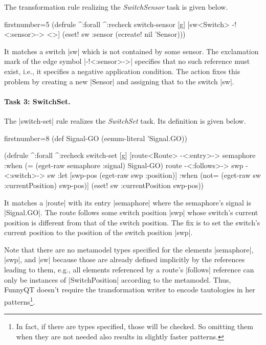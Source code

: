 \documentclass[submission]{eptcs}
\newcommand{\code}{\clojureinline}
\begin{document}
The transformation rule realizing the \emph{SwitchSensor} task is given below.

\begin{clojurecode*}{firstnumber=5}
(defrule ^:forall ^:recheck switch-sensor [g]
  [sw<Switch> -!<:sensor>-> <>]
  (eset! sw :sensor (ecreate! nil 'Sensor)))
\end{clojurecode*}

It matches a switch \code|sw| which is not contained by some sensor.  The
exclamation mark of the edge symbol \code|-!<:sensor>->| specifies that no such
reference must exist, i.e., it specifies a negative application condition.  The
action fixes this problem by creating a new \code|Sensor| and assigning that to
the switch \code|sw|.


\paragraph{Task 3: SwitchSet.}

The \code|switch-set| rule realizes the \emph{SwitchSet} task.  Its definition
is given below.

\begin{clojurecode*}{firstnumber=8}
(def Signal-GO (eenum-literal 'Signal.GO))

(defrule ^:forall ^:recheck switch-set [g]
  [route<Route> -<:entry>-> semaphore
   :when (= (eget-raw semaphore :signal) Signal-GO)
   route -<:follows>-> swp -<:switch>-> sw
   :let [swp-pos (eget-raw swp :position)]
   :when (not= (eget-raw sw :currentPosition) swp-pos)]
  (eset! sw :currentPosition swp-pos))
\end{clojurecode*}

It matches a \code|route| with its entry \code|semaphore| where the semaphore's
signal is \code|Signal.GO|.  The route follows some switch position \code|swp|
whose switch's current position is different from that of the switch position.
The fix is to set the switch's current position to the position of the switch
position \code|swp|.

Note that there are no metamodel types specified for the elements
\code|semaphore|, \code|swp|, and \code|sw| because those are already defined
implicitly by the references leading to them, e.g., all elements referenced by
a route's \code|follows| reference can only be instances of
\code|SwitchPosition| according to the metamodel.  Thus, FunnyQT doesn't
require the transformation writer to encode tautologies in her
patterns\footnote{In fact, if there are types specified, those will be checked.
  So omitting them when they are not needed also results in slightly faster
  patterns.}.
\end{document}
